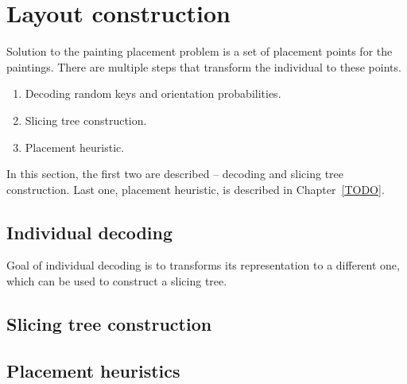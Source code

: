 \section{Layout construction}\label{sec:layout-construction}

Solution to the painting placement problem is a set of placement points for the paintings.
There are multiple steps that transform the individual to these points.

\begin{enumerate}
    \item Decoding random keys and orientation probabilities.
    \item Slicing tree construction.
    \item Placement heuristic.
\end{enumerate}

In this section, the first two are described – decoding and slicing tree construction.
Last one, placement heuristic, is described in Chapter~\ref{TODO}.

\subsection{Individual decoding}\label{subsec:individual-decoding}
Goal of individual decoding is to transforms its representation to a different one,
which can be used to construct a slicing tree.

\subsection{Slicing tree construction}\label{subsec:slicing-tree-construction}

\subsection{Placement heuristics}\label{subsec:placement-heuristics}